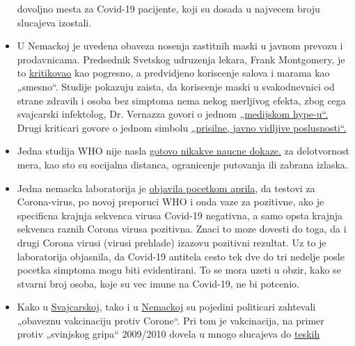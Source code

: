\begin{itemize}
  dovoljno mesta za Covid-19 pacijente, koji su dosada u najvecem broju
  slucajeva izostali.
\item
  U Nemackoj je uvedena obaveza nosenja zastitnih maski u javnom prevozu
  i prodavnicama. Predsednik Svetskog udruzenja lekara, Frank
  Montgomery, je to
  \href{https://www.aerztezeitung.de/Politik/Montgomery-haelt-Maskenpflicht-fuer-falsch-408844.html}{kritikovao}
  kao pogresno, a predvidjeno koriscenje salova i marama kao „smesno``.
  Studije pokazuju zaista, da koriscenje maski u svakodnevnici od strane
  zdravih i osoba bez simptoma nema nekog merljivog efekta, zbog cega
  svajcarski infektolog, Dr. Vernazza govori o jednom
  \href{https://infekt.ch/2020/04/atemschutzmasken-fuer-alle-medienhype-oder-unverzichtbar/}{„medijskom
  hype-u``.} Drugi kriticari govore o jednom simbolu
  \href{https://multipolar-magazin.de/artikel/maskenpflicht-gesellschaftliches-klima}{„prisilne,
  javno vidljive poslusnosti``.}
\item
  Jedna studija WHO nije nasla
  \href{https://www.heise.de/tp/features/COVID-19-WHO-Studie-findet-kaum-Belege-fuer-die-Wirksamkeit-von-Eindaemmungsmassnahmen-4706446.html}{gotovo
  nikakve naucne dokaze.} za delotvornost mera, kao sto su socijalna
  distanca, ogranicenje putovanja ili zabrana izlaska.
\item
  Jedna nemacka laboratorija je
  \href{http://www.labor-augsburg-mvz.de/de/aktuelles/coronavirus}{objavila
  pocetkom aprila}, da testovi za Corona-virus, po novoj preporuci WHO i
  onda vaze za pozitivne, ako je specificna krajnja sekvenca virusa
  Covid-19 negativna, a samo opsta krajnja sekvenca raznih Corona virusa
  pozitivna. Znaci to moze dovesti do toga, da i drugi Corona virusi
  (virusi prehlade) izazovu pozitivni rezultat. Uz to je laboratorija
  objasnila, da Covid-19 antitela cesto tek dve do tri nedelje posle
  pocetka simptoma mogu biti evidentirani. To se mora uzeti u obzir,
  kako se stvarni broj osoba, koje su vec imune na Covid-19, ne bi
  potcenio.
\item
  Kako u
  \href{https://www.20min.ch/schweiz/news/story/-rzte-und-Politiker-fordern-Corona-Impfzwang-20853917}{Svajcarskoj},
  tako i u
  \href{https://www.faz.net/agenturmeldungen/dpa/soeder-waere-fuer-deutschlandweite-impfpflicht-gegen-corona-16738369.html}{Nemackoj}
  su pojedini politicari zahtevali „obaveznu vakcinaciju protiv
  Corone``. Pri tom je vakcinacija, na primer protiv „svinjskog gripa``
  2009/2010 dovela u mnogo slucajeva do
  \href{https://www.ibtimes.co.uk/brain-damaged-uk-victims-swine-flu-vaccine-get-60-million-compensation-1438572}{teskih
}
\end{itemize}

